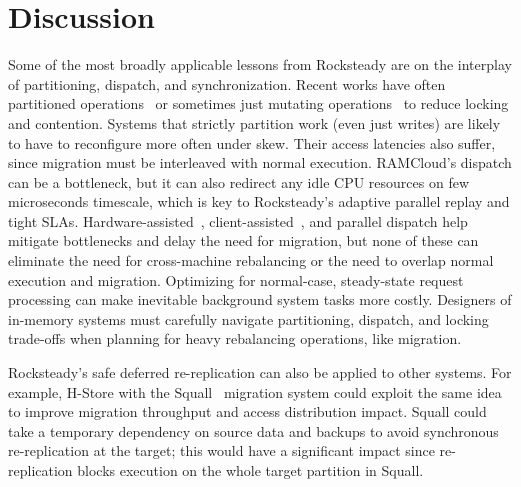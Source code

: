 \section{Discussion} 


Some of the most broadly applicable lessons from Rocksteady are on the
interplay of partitioning, dispatch, and synchronization. Recent works have
often partitioned operations~\cite{hstore,redis} or sometimes just mutating
operations~\cite{mica} to reduce locking and contention.  Systems that strictly
partition work (even just writes) are likely to have to reconfigure more often
under skew.  Their access latencies also suffer, since migration must be
interleaved with normal execution.  RAMCloud's dispatch can be a bottleneck,
but it can also redirect any idle CPU resources on few microseconds timescale,
which is key to Rocksteady's adaptive parallel replay and tight SLAs.
Hardware-assisted~\cite{flexnic}, client-assisted~\cite{mica}, and parallel dispatch help
mitigate bottlenecks and delay the need for migration, but none of these can
eliminate the need for cross-machine rebalancing or the need to overlap normal
execution and migration.
%
Optimizing for normal-case, steady-state request processing can make inevitable
background system tasks more costly.  Designers of in-memory systems must
carefully navigate partitioning, dispatch, and locking trade-offs when planning
for heavy rebalancing operations, like migration.

Rocksteady's safe deferred re-replication can also be applied to other systems.
For example, H-Store with the Squall~\cite{squall} migration system could
exploit the same idea to improve migration throughput and access distribution
impact.  Squall could take a temporary dependency on source data and backups to
avoid synchronous re-replication at the target; this would have a significant
impact since re-replication blocks execution on the whole target partition in
Squall.

%
%
%
%
%
%

